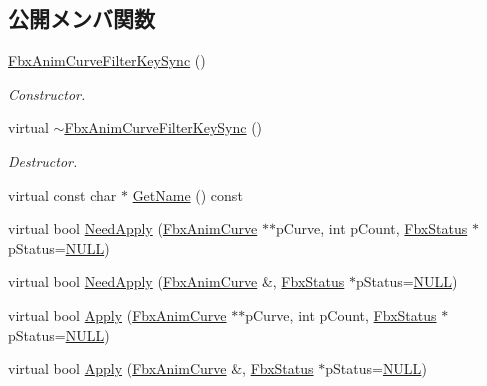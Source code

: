 \subsection*{公開メンバ関数}
\begin{DoxyCompactItemize}
\item 
\hyperlink{class_fbx_anim_curve_filter_key_sync_ad9ffdb980ce6b78a53a5447c2e7d61d9}{Fbx\+Anim\+Curve\+Filter\+Key\+Sync} ()
\begin{DoxyCompactList}\small\item\em Constructor. \end{DoxyCompactList}\item 
virtual \hyperlink{class_fbx_anim_curve_filter_key_sync_a4435b8ba11b1978833538f18405811fb}{$\sim$\+Fbx\+Anim\+Curve\+Filter\+Key\+Sync} ()
\begin{DoxyCompactList}\small\item\em Destructor. \end{DoxyCompactList}\item 
virtual const char $\ast$ \hyperlink{class_fbx_anim_curve_filter_key_sync_acf561aadd8d5f4b35826044c6d50b6b4}{Get\+Name} () const
\item 
virtual bool \hyperlink{class_fbx_anim_curve_filter_key_sync_aa26aa6ed4121353882589902fb0db961}{Need\+Apply} (\hyperlink{class_fbx_anim_curve}{Fbx\+Anim\+Curve} $\ast$$\ast$p\+Curve, int p\+Count, \hyperlink{class_fbx_status}{Fbx\+Status} $\ast$p\+Status=\hyperlink{fbxarch_8h_a070d2ce7b6bb7e5c05602aa8c308d0c4}{N\+U\+LL})
\item 
virtual bool \hyperlink{class_fbx_anim_curve_filter_key_sync_a5f255ee33fe2ecad8c61562931840c01}{Need\+Apply} (\hyperlink{class_fbx_anim_curve}{Fbx\+Anim\+Curve} \&, \hyperlink{class_fbx_status}{Fbx\+Status} $\ast$p\+Status=\hyperlink{fbxarch_8h_a070d2ce7b6bb7e5c05602aa8c308d0c4}{N\+U\+LL})
\item 
virtual bool \hyperlink{class_fbx_anim_curve_filter_key_sync_aa42855bf1a2c78e9d7392bdc48d99881}{Apply} (\hyperlink{class_fbx_anim_curve}{Fbx\+Anim\+Curve} $\ast$$\ast$p\+Curve, int p\+Count, \hyperlink{class_fbx_status}{Fbx\+Status} $\ast$p\+Status=\hyperlink{fbxarch_8h_a070d2ce7b6bb7e5c05602aa8c308d0c4}{N\+U\+LL})
\item 
virtual bool \hyperlink{class_fbx_anim_curve_filter_key_sync_acc77ba686024c5f204e9e78e52dc15f5}{Apply} (\hyperlink{class_fbx_anim_curve}{Fbx\+Anim\+Curve} \&, \hyperlink{class_fbx_status}{Fbx\+Status} $\ast$p\+Status=\hyperlink{fbxarch_8h_a070d2ce7b6bb7e5c05602aa8c308d0c4}{N\+U\+LL})
\end{DoxyCompactItemize}
